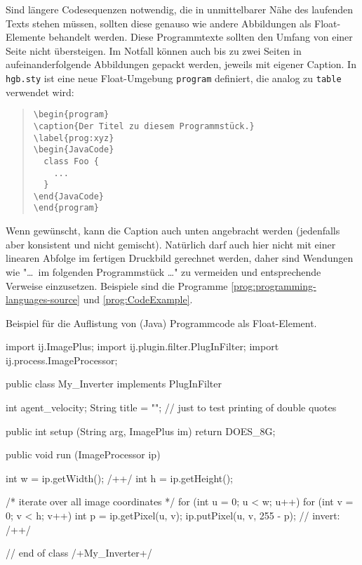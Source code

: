 Sind längere Codesequenzen notwendig, die in unmittelbarer Nähe des laufenden
Texts stehen müssen, sollten diese genauso wie andere Abbildungen als
Float-Elemente behandelt werden. Diese Programmtexte sollten den Umfang von
einer Seite nicht übersteigen. Im Notfall können auch bis zu zwei Seiten in
aufeinanderfolgende Abbildungen gepackt werden, jeweils mit eigener Caption.
In \texttt{hgb.sty} ist eine neue Float-Umgebung \texttt{program} definiert,
die analog zu \texttt{table} verwendet wird:
%
\begin{quote}
\begin{verbatim}
\begin{program}
\caption{Der Titel zu diesem Programmstück.}
\label{prog:xyz}
\begin{JavaCode}
  class Foo {
    ...
  }
\end{JavaCode}
\end{program}
\end{verbatim}
\end{quote}
%
Wenn gewünscht, kann die Caption auch unten angebracht werden (jedenfalls
aber konsistent und nicht gemischt). Natürlich darf auch hier nicht mit einer
linearen Abfolge im fertigen Druckbild gerechnet werden, daher sind Wendungen
wie "\ldots\ im folgenden Programmstück \ldots" zu vermeiden und
entsprechende Verweise einzusetzen. Beispiele sind die Programme
\ref{prog:programming-languages-source} und \ref{prog:CodeExample}.

\begin{program}
\caption{Beispiel für die Auflistung von (Java) Programmcode als Float-Element.}
\label{prog:CodeExample}
\begin{JavaCode}
import ij.ImagePlus;
import ij.plugin.filter.PlugInFilter;
import ij.process.ImageProcessor;

public class My_Inverter implements PlugInFilter {
	int agent_velocity;
	String title = ""; 				// just to test printing of double quotes

	public int setup (String arg, ImagePlus im) {
		return DOES_8G;
	}

	public void run (ImageProcessor ip) {
		int w = ip.getWidth(); /+\label{ExampleCodeLabel}+/
		int h = ip.getHeight();

		/* iterate over all image coordinates */
		for (int u = 0; u < w; u++) {
			for (int v = 0; v < h; v++) {
				int p = ip.getPixel(u, v);
				ip.putPixel(u, v, 255 - p); // invert: /+\label{MathInCode}+/
			}
		}
	}
} // end of class /+My\_Inverter+/
\end{JavaCode}
%
\end{program}


